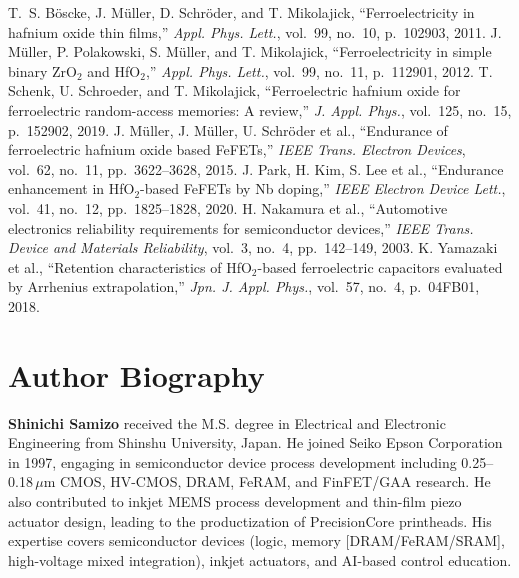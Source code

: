\documentclass[conference]{IEEEtran}
\begin{document}
\begin{thebibliography}{8}
 T.~S. Böscke, J. Müller, D. Schröder, and T. Mikolajick, ``Ferroelectricity in hafnium oxide thin films,'' \textit{Appl. Phys. Lett.}, vol.~99, no.~10, p.~102903, 2011.
 J. Müller, P. Polakowski, S. Müller, and T. Mikolajick, ``Ferroelectricity in simple binary ZrO$_2$ and HfO$_2$,'' \textit{Appl. Phys. Lett.}, vol.~99, no.~11, p.~112901, 2012.
 T. Schenk, U. Schroeder, and T. Mikolajick, ``Ferroelectric hafnium oxide for ferroelectric random-access memories: A review,'' \textit{J. Appl. Phys.}, vol.~125, no.~15, p.~152902, 2019.
 J. Müller, J. Müller, U. Schröder et al., ``Endurance of ferroelectric hafnium oxide based FeFETs,'' \textit{IEEE Trans. Electron Devices}, vol.~62, no.~11, pp.~3622--3628, 2015.
 J. Park, H. Kim, S. Lee et al., ``Endurance enhancement in HfO$_2$-based FeFETs by Nb doping,'' \textit{IEEE Electron Device Lett.}, vol.~41, no.~12, pp.~1825--1828, 2020.
 H. Nakamura et al., ``Automotive electronics reliability requirements for semiconductor devices,'' \textit{IEEE Trans. Device and Materials Reliability}, vol.~3, no.~4, pp.~142--149, 2003.
 K. Yamazaki et al., ``Retention characteristics of HfO$_2$-based ferroelectric capacitors evaluated by Arrhenius extrapolation,'' \textit{Jpn. J. Appl. Phys.}, vol.~57, no.~4, p.~04FB01, 2018.
\end{thebibliography}

\section*{Author Biography}
\textbf{Shinichi Samizo} received the M.S. degree in Electrical and Electronic Engineering from Shinshu University, Japan. He joined Seiko Epson Corporation in 1997, engaging in semiconductor device process development including 0.25--0.18\,$\mu$m CMOS, HV-CMOS, DRAM, FeRAM, and FinFET/GAA research. He also contributed to inkjet MEMS process development and thin-film piezo actuator design, leading to the productization of PrecisionCore printheads. His expertise covers semiconductor devices (logic, memory [DRAM/FeRAM/SRAM], high-voltage mixed integration), inkjet actuators, and AI-based control education.
\end{document}
